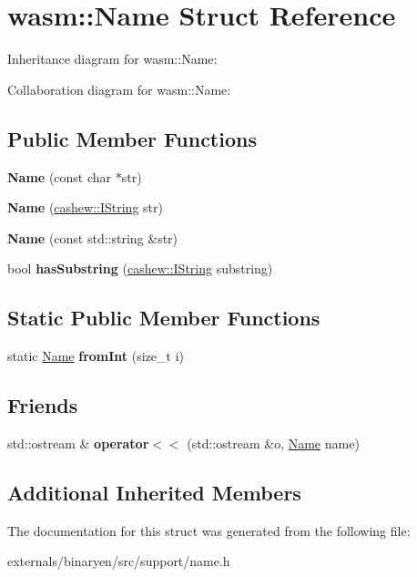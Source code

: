\hypertarget{structwasm_1_1_name}{}\section{wasm\+:\+:Name Struct Reference}
\label{structwasm_1_1_name}


Inheritance diagram for wasm\+:\+:Name\+:


Collaboration diagram for wasm\+:\+:Name\+:
\subsection*{Public Member Functions}
\begin{DoxyCompactItemize}
\item 
\mbox{\label{structwasm_1_1_name_aa1205b0941b94af16dd42506cf6099cd}} 
{\bfseries Name} (const char $\ast$str)
\item 
\mbox{\label{structwasm_1_1_name_ac4d4b812fb12082aab42e029e9ad2384}} 
{\bfseries Name} (\mbox{\hyperlink{structcashew_1_1_i_string}{cashew\+::\+I\+String}} str)
\item 
\mbox{\label{structwasm_1_1_name_aa89051ed1a554d745ffb166bdbd5ddc1}} 
{\bfseries Name} (const std\+::string \&str)
\item 
\mbox{\label{structwasm_1_1_name_a026d299fc06b9077163c4f9de8adc757}} 
bool {\bfseries has\+Substring} (\mbox{\hyperlink{structcashew_1_1_i_string}{cashew\+::\+I\+String}} substring)
\end{DoxyCompactItemize}
\subsection*{Static Public Member Functions}
\begin{DoxyCompactItemize}
\item 
\mbox{\label{structwasm_1_1_name_a877921ecbc28fea82da2d70ff651bd68}} 
static \mbox{\hyperlink{structwasm_1_1_name}{Name}} {\bfseries from\+Int} (size\+\_\+t i)
\end{DoxyCompactItemize}
\subsection*{Friends}
\begin{DoxyCompactItemize}
\item 
\mbox{\label{structwasm_1_1_name_af2683093a01b11bdb3410898114ef3ac}} 
std\+::ostream \& {\bfseries operator$<$$<$} (std\+::ostream \&o, \mbox{\hyperlink{structwasm_1_1_name}{Name}} name)
\end{DoxyCompactItemize}
\subsection*{Additional Inherited Members}


The documentation for this struct was generated from the following file\+:\begin{DoxyCompactItemize}
\item 
externals/binaryen/src/support/name.\+h\end{DoxyCompactItemize}
